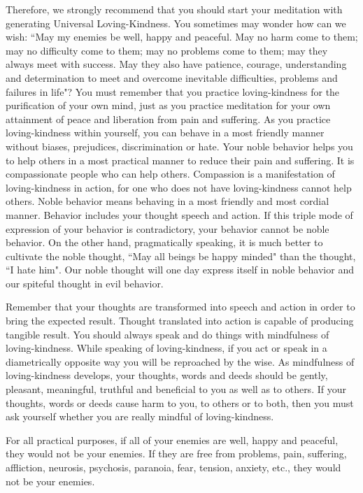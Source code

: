 Therefore, we strongly recommend that you should start your meditation with
generating Universal Loving-Kindness.  You sometimes may wonder how can we wish:
``May my enemies be well, happy and peaceful. May no harm come to them; may no
difficulty come to them; may no problems come to them; may they always meet with
success. May they also have patience, courage, understanding and determination
to meet and overcome inevitable difficulties, problems and failures in life"?
You must remember that you practice loving-kindness for the purification of your
own mind, just as you practice meditation for your own attainment of peace and
liberation from pain and suffering. As you practice loving-kindness within
yourself, you can behave in a most friendly manner without biases, prejudices,
discrimination or hate. Your noble behavior helps you to help others in a most
practical manner to reduce their pain and suffering. It is compassionate people
who can help others. Compassion is a manifestation of loving-kindness in action,
for one who does not have loving-kindness cannot help others. Noble behavior
means behaving in a most friendly and most cordial manner. Behavior includes
your thought speech and action. If this triple mode of expression of your
behavior is contradictory, your behavior cannot be noble behavior. On the other
hand, pragmatically speaking, it is much better to cultivate the noble thought,
``May all beings be happy minded" than the thought, ``I hate him". Our noble
thought will one day express itself in noble behavior and our spiteful thought
in evil behavior.

Remember that your thoughts are transformed into speech and action in order to
bring the expected result. Thought translated into action is capable of
producing tangible result. You should always speak and do things with
mindfulness of loving-kindness. While speaking of loving-kindness, if you act or
speak in a diametrically opposite way you will be reproached by the wise. As
mindfulness of loving-kindness develops, your thoughts, words and deeds should
be gently, pleasant, meaningful, truthful and beneficial to you as well as to
others. If your thoughts, words or deeds cause harm to you, to others or to
both, then you must ask yourself whether you are really mindful of
loving-kindness.

For all practical purposes, if all of your enemies are well, happy and peaceful,
they would not be your enemies. If they are free from problems, pain, suffering,
affliction, neurosis, psychosis, paranoia, fear, tension, anxiety, etc., they
would not be your enemies.

